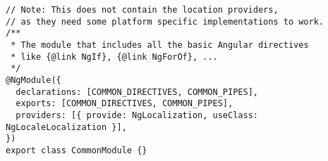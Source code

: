 \begin{verbatim}
// Note: This does not contain the location providers,
// as they need some platform specific implementations to work.
/**
 * The module that includes all the basic Angular directives
 * like {@link NgIf}, {@link NgForOf}, ...
 */
@NgModule({
  declarations: [COMMON_DIRECTIVES, COMMON_PIPES],
  exports: [COMMON_DIRECTIVES, COMMON_PIPES],
  providers: [{ provide: NgLocalization, useClass: NgLocaleLocalization }],
})
export class CommonModule {}
\end{verbatim}
